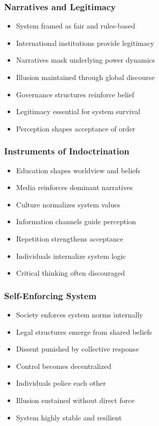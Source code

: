 \begin{frame}[fragile]\frametitle{Narratives and Legitimacy}
\begin{itemize}
\item System framed as fair and rules-based
\item International institutions provide legitimacy
\item Narratives mask underlying power dynamics
\item Illusion maintained through global discourse
\item Governance structures reinforce belief
\item Legitimacy essential for system survival
\item Perception shapes acceptance of order
\end{itemize}
\end{frame}

\begin{frame}[fragile]\frametitle{Instruments of Indoctrination}
\begin{itemize}
\item Education shapes worldview and beliefs
\item Media reinforces dominant narratives
\item Culture normalizes system values
\item Information channels guide perception
\item Repetition strengthens acceptance
\item Individuals internalize system logic
\item Critical thinking often discouraged
\end{itemize}
\end{frame}

\begin{frame}[fragile]\frametitle{Self-Enforcing System}
\begin{itemize}
\item Society enforces system norms internally
\item Legal structures emerge from shared beliefs
\item Dissent punished by collective response
\item Control becomes decentralized
\item Individuals police each other
\item Illusion sustained without direct force
\item System highly stable and resilient
\end{itemize}
\end{frame}
